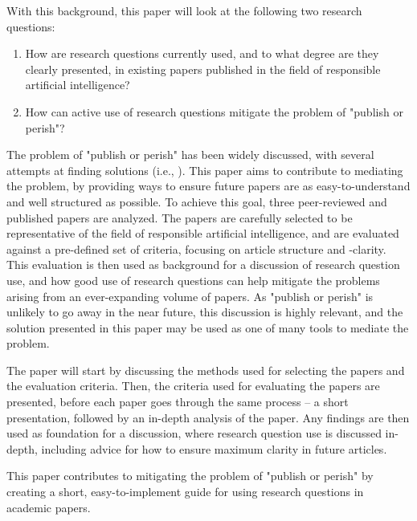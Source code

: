 With this background, this paper will look at the following two research questions:
\begin{enumerate}
    \item How are research questions currently used, and to what degree are they clearly presented, in existing papers published in the field of responsible artificial intelligence?
    \item How can active use of research questions mitigate the problem of "publish or perish"?
\end{enumerate}

The problem of "publish or perish" has been widely discussed, with several attempts at finding solutions (i.e., \cite{Grimes_2018,Davies_2017,Bornmann_2015}). This paper aims to contribute to mediating the problem, by providing ways to ensure future papers are as easy-to-understand and well structured as possible. To achieve this goal, three peer-reviewed and published papers are analyzed. The papers are carefully selected to be representative of the field of responsible artificial intelligence, and are evaluated against a pre-defined set of criteria, focusing on article structure and -clarity. This evaluation is then used as background for a discussion of research question use, and how good use of research questions can help mitigate the problems arising from an ever-expanding volume of papers. As "publish or perish" is unlikely to go away in the near future, this discussion is highly relevant, and the solution presented in this paper may be used as one of many tools to mediate the problem.

The paper will start by discussing the methods used for selecting the papers and the evaluation criteria. Then, the criteria used for evaluating the papers are presented, before each paper goes through the same process -- a short presentation, followed by an in-depth analysis of the paper. Any findings are then used as foundation for a discussion, where research question use is discussed in-depth, including advice for how to ensure maximum clarity in future articles.

This paper contributes to mitigating the problem of "publish or perish" by creating a short, easy-to-implement guide for using research questions in academic papers.